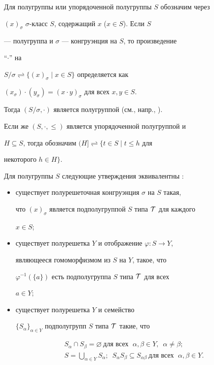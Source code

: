 \label{begin} 


 


Для полугруппы или упорядоченной полугруппы $S$ обозначим через 


$(x)_\sigma$\; $\sigma$-класс $S$, содержащий $x$ ($x\in S$). Если $S$ 


--- полугруппа и $\sigma$ --- конгруэнция на $S$, то произведение 


``$\cdot$'' на 


$S/\sigma\rightleftharpoons\{(x)_\sigma\mid x\in S\}$ определяется как 


$(x_\sigma)\cdot(y_\sigma)=(x\cdot y)_\sigma$ для всех $x,y\in S$. 


Тогда $(S/\sigma,\cdot)$ является полугруппой (см., напр., \cite{1}). 


Если же $(S,\cdot,\le)$ является упорядоченной полугруппой и 


$H\subseteq S$, тогда обозначим $(H]\rightleftharpoons\{t\in S\mid t\le 


h$ для 


некоторого $h\in H\}$. 


 


Для полугруппы $S$ следующие утверждения эквивалентны \cite{2}: 


\begin{itemize} 


\item[1)] существует полурешеточная конгруэнция $\sigma$ на $S$ такая, 


что $(x)_\sigma$ является подполугруппой $S$ типа $\cal T$ для каждого 


$x\in S$; 


\item[2)] существует полурешетка $Y$ и отображение $\varphi:S\to Y$, 


являющееся гомоморфизмом из $S$ на $Y$, такое, что 


$\varphi^{-1}(\{a\})$ есть подполугруппа $S$ типа $\cal T$ для всех 


$a\in Y$; 


\item[3)] существует полурешетка $Y$ и семейство 


$\{S_\alpha\}_{\alpha\in Y}$ подполугрупп $S$ типа $\cal T$ такие, что 


\begin{gather*} 


S_\alpha\cap S_\beta=\varnothing\ \text{для всех }\;\alpha,\beta\in Y, 


\ \; \alpha\ne\beta; \\ 


S=\bigcup_{\alpha\in Y}S_\alpha;\ \; S_\alpha S_\beta\subseteq 


S_{\alpha\beta}\ \text{для всех }\; \alpha,\beta\in Y. 


\end{gather*} 


\end{itemize} 


